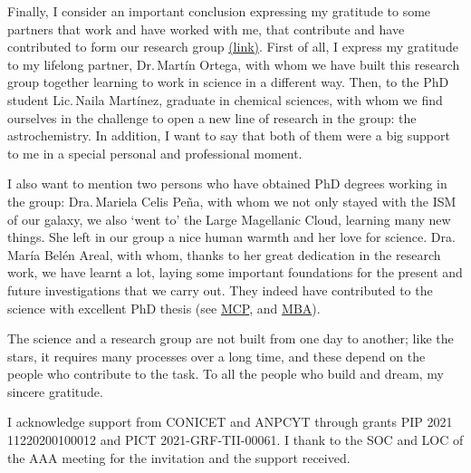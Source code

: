 \documentclass[baaa]{baaa}
\begin{document}
Finally, I consider an important conclusion expressing my gratitude to some partners that work and have worked with me, that contribute and have contributed to form our research group \href{https://interestelariafe.wixsite.com/mediointerestelar}{(link)}.  
First of all, I express my gratitude to my lifelong partner,
Dr.\,Martín Ortega, with whom we have built this research group together learning to work in science in a different way.
Then, to the PhD student Lic.\,Naila Martínez, graduate
in chemical sciences, with whom we find ourselves in the challenge
to open a new line of research in the group: the astrochemistry.
In addition, I want to say that both of them were a big support to me in a special personal and professional moment.

I also want to mention two persons who have obtained PhD degrees
working in the group: Dra.\,Mariela Celis Peña, with whom we not only stayed
with the ISM of our galaxy, we also `went to' the Large Magellanic Cloud, learning many new things. She left in our group a nice human warmth and her love for science. Dra.\,María Belén Areal, with whom, thanks to her great dedication in the
research work, we have learnt a lot, laying some important foundations for the present and future investigations that we carry out. 
They indeed have contributed to the 
science with excellent PhD thesis (see \href{https://bibliotecadigital.exactas.uba.ar/collection/tesis/document/tesis_n6906_CelisPena}{MCP}, and \href{https://bibliotecadigital.exactas.uba.ar/collection/tesis/document/tesis_n7240_Areal}{MBA}).

The science and a research group are not built from one day to another; like the stars, it requires many processes over a long time, and these depend on the people who contribute to the task. To all the people who build and dream, my sincere gratitude.

\begin{acknowledgement}
I acknowledge support from CONICET and ANPCYT through grants PIP 2021 11220200100012 and PICT 2021-GRF-TII-00061. I thank to the SOC and LOC of the AAA meeting for the invitation and the support received. 
\end{acknowledgement}



\small

 
\end{document}
